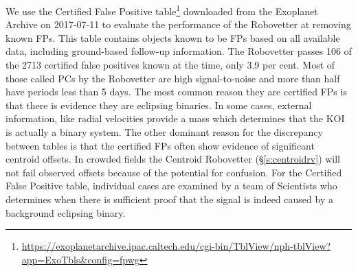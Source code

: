 We use the Certified False Positive table\footnote{\url{https://exoplanetarchive.ipac.caltech.edu/cgi-bin/TblView/nph-tblView?app=ExoTbls\&config=fpwg}} downloaded from the Exoplanet Archive on 2017-07-11 to evaluate the performance of the Robovetter at removing known FPs. This table contains objects known to be FPs based on all available data, including ground-based follow-up information.  The Robovetter passes 106 of the 2713 certified false positives known at the time, only 3.9 per cent.  Most of those called PCs by the Robovetter are high signal-to-noise and more than half have periods less than 5 days.  The most common reason they are certified FPs is that there is evidence they are eclipsing binaries. In some cases, external information, like radial velocities provide a mass which determines that the KOI is actually a binary system. The other dominant reason for the discrepancy between tables is that the certified FPs often show evidence of significant centroid offsets. In crowded fields the Centroid Robovetter (\S\ref{s:centroidrv}) will not fail observed offsets because of the potential for confusion. For the Certified False Positive table, individual cases are examined by a team of Scientists who determines when there is sufficient proof that the signal is indeed caused by a background eclipsing binary.  


